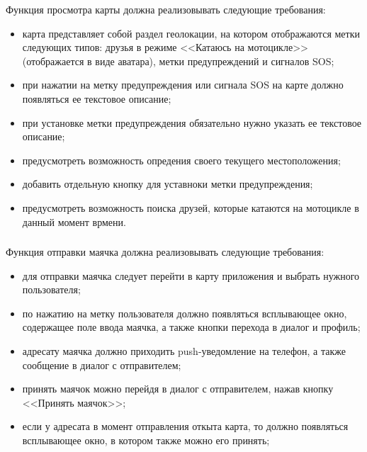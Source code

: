 Функция просмотра карты должна реализовывать следующие требования:
\begin{itemize}
	\item карта представляет собой раздел геолокации, на котором отображаются метки следующих типов: друзья в режиме <<Катаюсь на мотоцикле>> (отображается в виде аватара), метки предупреждений и сигналов SOS;
	\item при нажатии на метку предупреждения или сигнала SOS на карте должно появляться ее текстовое описание;
	\item при установке метки предупреждения обязательно нужно указать ее текстовое описание;
	\item предусмотреть возможность опредения своего текущего местоположения;
	\item добавить отдельную кнопку для уставноки метки предупреждения;
	\item предусмотреть возможность поиска друзей, которые катаются на мотоцикле в данный момент врмени.
\end{itemize}

\subsubsection{}
\label{sec:domain:specification:student_history}

Функция отправки маячка должна реализовывать следующие требования:
\begin{itemize}
	\item для отправки маячка следует перейти в карту приложения и выбрать нужного пользователя;
	\item по нажатию на метку пользователя должно появляться всплывающее окно, содержащее поле ввода маячка, а также кнопки перехода в диалог и профиль;
	\item адресату маячка должно приходить push-уведомление на телефон, а также сообщение в диалог с отправителем;
	\item принять маячок можно перейдя в диалог с отправителем, нажав кнопку <<Принять маячок>>;
	\item если у адресата в момент отправления откыта карта, то должно появляться всплывающее окно, в котором также можно его принять;
\end{itemize}

\subsubsection{}
\label{sec:domain:specification:student_history}

